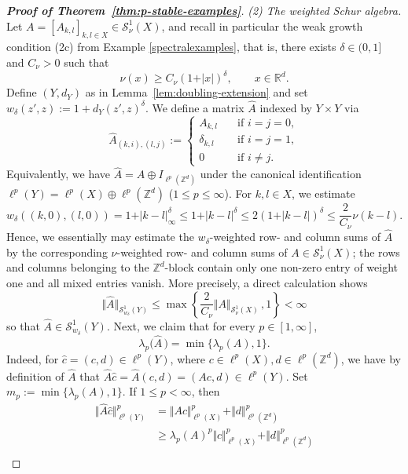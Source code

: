 \documentclass{amsart}
\begin{document}
\begin{proof}[\textbf{Proof of Theorem~\ref{thm:p-stable-examples}}]
\emph{(2) The weighted Schur algebra.}
Let \(A = [A_{k,l}]_{k,l\in X} \in\mathcal S^1_\nu(X)\), and recall in particular the weak growth condition (2c) from Example \ref{spectralexamples}, that is, there exists \(\delta\in(0,1]\) and \(C_\nu>0\) such that
$$\nu(x)\geq C_\nu(1+\vert x \vert)^\delta, \qquad x\in\mathbb R^d.$$
Define \((Y,d_Y)\) as in Lemma~\ref{lem:doubling-extension} and set $w_\delta (z',z) := 1+ d_Y(z',z)^\delta$. We define a matrix \(\widehat A\) indexed by \(Y\times Y\) via 
$$\widehat A_{(k,i),(l,j)} := \begin{cases}
   A_{k,l} \quad &\text{if } i=j=0,\\
   \delta_{k,l} \quad &\text{if } i=j=1,\\
   0 \quad &\text{if } i\neq j.
 \end{cases}$$
Equivalently, we have $\widehat A = A\oplus I_{\ell^p(\mathbb Z^d)}$ under the canonical identification $\ell^p(Y) = \ell^p(X) \oplus \ell^p(\mathbb Z^d)$ ($1\leq p \leq \infty$). For \(k,l\in X\), we estimate
$$w_\delta((k,0),(l,0)) = 1+\vert k-l \vert_\infty^\delta \leq 1+\vert k-l \vert^\delta \leq 2(1+\vert k-l\vert)^\delta \leq \frac{2}{C_{\nu}} \nu(k-l).$$
Hence, we essentially may estimate the $w_\delta$-weighted row- and column sums of $\widehat{A}$ by the corresponding $\nu$-weighted row- and column sums of $A \in \mathcal S^1_\nu(X)$; the rows and columns belonging to the $\mathbb{Z}^d$-block contain only one non-zero entry of weight one and all mixed entries vanish. More precisely, a direct calculation shows 
$$\big\Vert \widehat{A} \big\Vert_{\mathcal S^1_{w_\delta}(Y)} \leq \max \left\lbrace \frac{2}{C_{\nu}} \Vert A\Vert_{\mathcal S^1_\nu(X)} \, ,  1 \right\rbrace < \infty$$
so that $\widehat A\in \mathcal S^1_{w_\delta}(Y)$. Next, we claim that for every \(p\in[1,\infty]\),
\begin{equation}\label{lambdapestimate}
\lambda_p \big( \widehat A \, \big) = \min \{\lambda_p(A),1\}.    
\end{equation}
Indeed, for $\widehat{c} = (c,d) \in \ell^p(Y)$, where $c\in \ell^p(X), d\in \ell^p(\mathbb{Z}^d)$, we have by definition of $\widehat{A}$ that $\widehat{A} \widehat{c} = \widehat{A}(c,d) = (Ac,d) \in \ell^p(Y)$. Set \(m_p:=\min\{\lambda_p(A),1\}\). If
\(1\leq p<\infty\), then
\[
\begin{aligned}
 \Vert\widehat A \widehat{c} \Vert_{\ell^p(Y)}^p  &=\Vert Ac\Vert_{\ell^p(X)}^p + \Vert d\Vert_{\ell^p(\mathbb{Z}^d)}^p \\
 &\geq \lambda_p(A)^p \Vert c\Vert_{\ell^p(X)}^p + \Vert d\Vert_{\ell^p(\mathbb{Z}^d)}^p \\

\end{aligned}\]
\end{proof}
\end{document}
